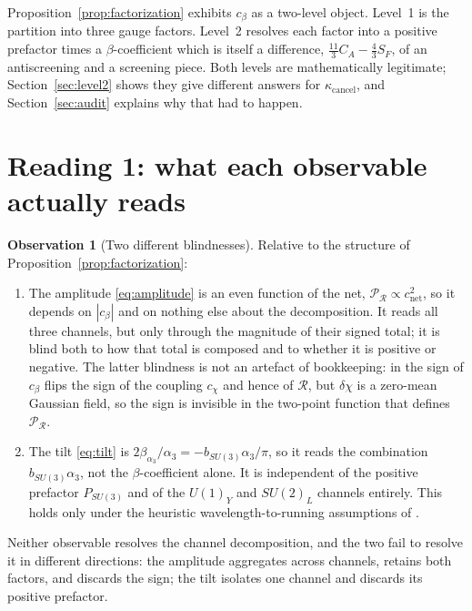 \documentclass[11pt]{article}
\theoremstyle{definition}
\newtheorem{observation}[theorem]{Observation}
\theoremstyle{remark}
\newcommand{\kcancel}{\kappa_{\mathrm{cancel}}}
\begin{document}
Proposition~\ref{prop:factorization} exhibits $c_\beta$ as a two-level object. Level~1 is the
partition into three gauge factors. Level~2 resolves each factor into a positive prefactor times a
$\beta$-coefficient which is itself a difference, $\tfrac{11}{3}C_A - \tfrac43 S_F$, of an
antiscreening and a screening piece. Both levels are mathematically legitimate; Section~\ref{sec:level2}
shows they give different answers for $\kcancel$, and Section~\ref{sec:audit} explains why that had
to happen.

\section{Reading 1: what each observable actually reads}
\label{sec:reading1}

\begin{observation}[Two different blindnesses]
\label{obs:blindness}
Relative to the structure of Proposition~\ref{prop:factorization}:
\begin{enumerate}
\item[(i)] The amplitude \eqref{eq:amplitude} is an even function of the net,
$\mathcal{P}_\mathcal{R} \propto c_{\mathrm{net}}^2$, so it depends on $|c_\beta|$ and on nothing
else about the decomposition. It reads all three channels, but only through the magnitude of their
signed total; it is blind both to how that total is composed and to whether it is positive or
negative. The latter blindness is not an artefact of bookkeeping: in \citep{TurokBoyle2023} the
sign of $c_\beta$ flips the sign of the coupling $c_\chi$ and hence of $\mathcal R$, but $\delta\chi$
is a zero-mean Gaussian field, so the sign is invisible in the two-point function that defines
$\mathcal{P}_\mathcal{R}$.
\item[(ii)] The tilt \eqref{eq:tilt} is $2\beta_{\alpha_3}/\alpha_3 = -b_{SU(3)}\alpha_3/\pi$, so it
reads the combination $b_{SU(3)}\alpha_3$, not the $\beta$-coefficient alone. It is independent of
the positive prefactor $P_{SU(3)}$ and of the $U(1)_Y$ and $SU(2)_L$ channels entirely. This holds
only under the heuristic wavelength-to-running assumptions of \citep{TurokBoyle2023}.
\end{enumerate}
Neither observable resolves the channel decomposition, and the two fail to resolve it in different
directions: the amplitude aggregates across channels, retains both factors, and discards the sign;
the tilt isolates one channel and discards its positive prefactor.
\end{observation}
\end{document}
